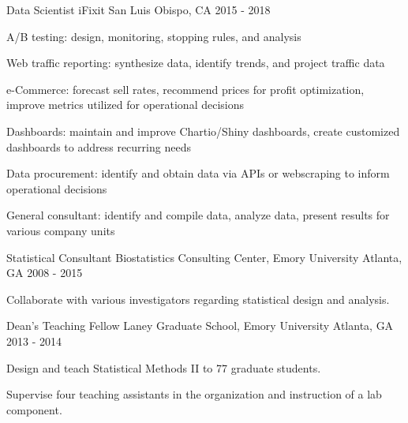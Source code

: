 


\begin{cventries}


\cventry
{Data Scientist} %
{iFixit} %
{San Luis Obispo, CA} %
{2015 - 2018} %
{ %
\begin{cvitems}
\item {A/B testing: design, monitoring, stopping rules, and analysis }
\item {Web traffic reporting: synthesize data, identify trends, and project traffic data}
\item {e-Commerce: forecast sell rates, recommend prices for profit optimization, improve metrics utilized for operational decisions}
\item{Dashboards: maintain and improve Chartio/Shiny dashboards, create customized dashboards to address recurring needs}
\item{Data procurement: identify and obtain data via APIs or webscraping to inform operational decisions}
\item{General consultant: identify and compile data, analyze data, present results for various company units}
\end{cvitems}
}


\cventry
{Statistical Consultant} %
{Biostatistics Consulting Center, Emory University} %
{Atlanta, GA} %
{2008 - 2015} %
{ %
\begin{cvitems}
\item {Collaborate with various investigators regarding statistical design and analysis.}
\end{cvitems}
}


\cventry
{Dean’s Teaching Fellow} %
{Laney Graduate School, Emory University} %
{Atlanta, GA} %
{2013 - 2014} %
{ %
\begin{cvitems}
\item {Design and teach Statistical Methods II to 77 graduate students.}
\item {Supervise four teaching assistants in the organization and instruction of a lab component.}
\end{cvitems}
}


\end{cventries}
